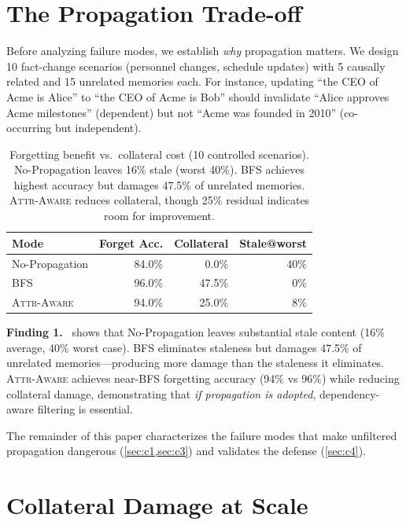 \documentclass{article}
\newcommand{\attraware}{\textsc{Attr-Aware}}
\newcommand{\bfsprop}{\textsc{BFS}}
\newcommand{\finding}[1]{\vspace{2pt}\noindent\textbf{Finding #1.}~}
\begin{document}
\section{The Propagation Trade-off}
\label{sec:tradeoff}

Before analyzing failure modes, we establish \textit{why} propagation matters.
We design 10 fact-change scenarios (personnel changes, schedule updates) with 5 causally related and 15 unrelated memories each.
For instance, updating ``the CEO of Acme is Alice'' to ``the CEO of Acme is Bob'' should invalidate ``Alice approves Acme milestones'' (dependent) but not ``Acme was founded in 2010'' (co-occurring but independent).

\begin{table}[htbp]
\centering
\footnotesize
\begin{tabular}{lrrr}
\toprule
\textbf{Mode} & \textbf{Forget Acc.} & \textbf{Collateral} & \textbf{Stale@worst} \\
\midrule
No-Propagation & 84.0\% & 0.0\% & 40\% \\
\bfsprop{} & 96.0\% & 47.5\% & 0\% \\
\attraware{} & 94.0\% & 25.0\% & 8\% \\
\bottomrule
\end{tabular}
\caption{Forgetting benefit vs.\ collateral cost (10 controlled scenarios).
No-Propagation leaves 16\% stale (worst 40\%).
BFS achieves highest accuracy but damages 47.5\% of unrelated memories.
\attraware{} reduces collateral, though 25\% residual indicates room for improvement.}
\label{tab:forgetting}
\end{table}

\finding{1}
 shows that No-Propagation leaves substantial stale content (16\% average, 40\% worst case).
BFS eliminates staleness but damages 47.5\% of unrelated memories---producing more damage than the staleness it eliminates.
\attraware{} achieves near-BFS forgetting accuracy (94\% vs 96\%) while reducing collateral damage, demonstrating that \textit{if propagation is adopted}, dependency-aware filtering is essential.

The remainder of this paper characterizes the failure modes that make unfiltered propagation dangerous (\cref{sec:c1,sec:c3}) and validates the defense (\cref{sec:c4}).


\section{Collateral Damage at Scale}
\label{sec:c1}
\end{document}
